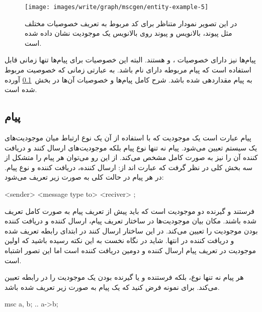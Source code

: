 \begin{figure}[h]
	\centering
	\texttt{[image: images/write/graph/mscgen/entity-example-5]}
	\caption[مثالی از نحوه تعریف خصوصیات مختلف موجودیت‌ها برای ایجاد شناسه
	بالانویس و پیوند]
	{در این تصویر نمودار متناظر برای کد مربوط به تعریف
	خصوصیات مختلف مثل پیوند، بالانویس و پیوند روی بالانویس یک موجودیت نشان داده شده
	است.}
	\label{images/write/graph/mscgen/entity-example-5}
\end{figure}

\begin{note}
پیام‌ها نیز دارای خصوصیات ،  و  هستند. البته این
خصوصیات برای پیام‌ها تنها زمانی قابل استفاده است که پیام مربوطه دارای نام باشد.
به عبارتی زمانی که خصوصیت  مربوط به پیام مقداردهی شده باشد. شرح کامل
پیام‌ها و خصوصیات آن‌ها در بخش~\ref{sec:message} آورده شده است.
\end{note}

\subsection{پیام}
\label{sec:message}

پیام عبارت است یک موجودیت که با استفاده از آن یک نوع ارتباط میان موجودیت‌های یک
سیستم تعیین می‌شود. پیام نه تنها نوع پیام بلکه موجودیت‌های ارسال کنند و دریافت
کننده آن را نیز به صورت کامل مشخص می‌کند. از این رو می‌توان هر پیام را متشکل از
سه بخش کلی در نظر گرفت که عبارت اند از: ارسال کننده، دریافت کننده و نوع پیام. در
 هر پیام در حالت کلی به صورت زیر تعریف می‌شود:

\begin{MSC}
<sender> <message type to> <reciver>  ;
\end{MSC}

فرستند و گیرنده دو موجودیت  است که باید پیش از تعریف پیام به صورت کامل تعریف شده
باشند. مکان بیان موجودیت‌ها در ساختار تعریف پیام، ارسال کننده و دریافت کننده
بودن موجودیت را تعیین می‌کند. در این ساختار ارسال کنند در ابتدای رابطه تعریف شده
و دریافت کننده در انتها. شاید در نگاه نخست به این نکته رسیده باشید که اولین
موجودیت در تعریف پیام ارسال کننده و دومین دریافت کننده است اما این تصور اشتباه
است.

هر پیام نه تنها نوع، بلکه فرستنده و یا گیرنده بودن یک موجودیت را
در رابطه تعیین می‌کند. برای نمونه فرض کنید که یک پیام به صورت زیر تعریف شده
باشد.

\begin{MSC}
msc {
	a, b;
	..
	a->b;
}
\end{MSC}


